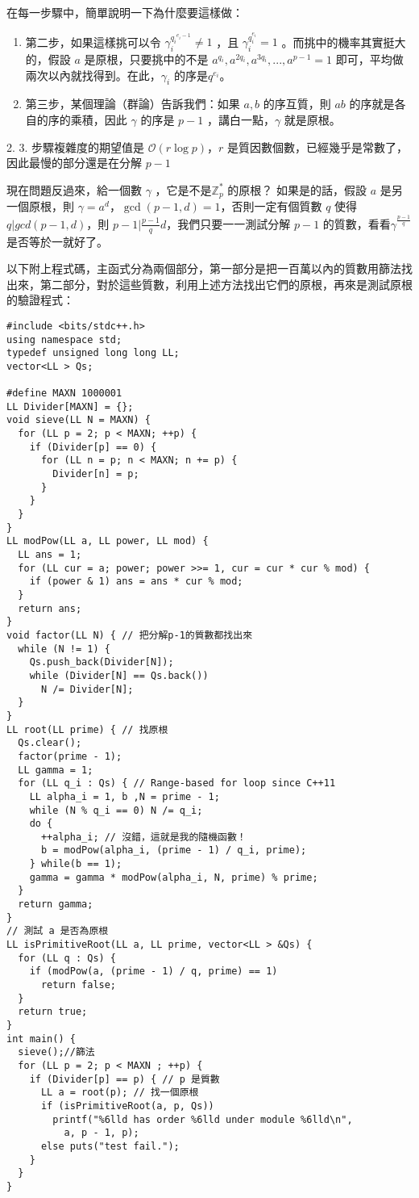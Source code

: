 在每一步驟中，簡單說明一下為什麼要這樣做：
\begin{enumerate}
\item 第二步，如果這樣挑可以令 $\gamma_i^{{q_i}^{e_i-1}}\neq 1$ ，且 $\gamma_i^{q_i^{e_i}}=1$ 。而挑中的機率其實挺大的，假設 $a$ 是原根，只要挑中的不是 $a^{q_i},a^{2q_i},a^{3q_i},...,a^{p-1}=1$ 即可，平均做兩次以內就找得到。在此，$\gamma_i$ 的序是$q^{e_i}$。
\item 第三步，某個理論（群論）告訴我們：如果 $a,b$ 的序互質，則 $ab$ 的序就是各自的序的乘積，因此 $\gamma$ 的序是 $p-1$ ，講白一點，$\gamma$ 就是原根。
\end{enumerate}

2. 3. 步驟複雜度的期望值是 $\mathcal{O}(r\log p)$，$r$ 是質因數個數，已經幾乎是常數了，因此最慢的部分還是在分解 $p-1$ 

現在問題反過來，給一個數 $\gamma$ ，它是不是$\mathbb Z_p^*$ 的原根？
如果是的話，假設 $a$ 是另一個原根，則 $\gamma=a^d$，$\gcd(p-1,d)=1$，否則一定有個質數 $q$ 使得 $q|gcd(p-1,d)$，則 $p-1|\frac {p-1} q d$，我們只要一一測試分解 $p-1$ 的質數，看看$\gamma^{\frac{p-1}{q}}$ 是否等於一就好了。

以下附上程式碼，主函式分為兩個部分，第一部分是把一百萬以內的質數用篩法找出來，第二部分，對於這些質數，利用上述方法找出它們的原根，再來是測試原根的驗證程式：
\begin{lstlisting}[caption=尋找與測試原根]
#include <bits/stdc++.h>
using namespace std;
typedef unsigned long long LL;
vector<LL > Qs;

#define MAXN 1000001
LL Divider[MAXN] = {};
void sieve(LL N = MAXN) {
  for (LL p = 2; p < MAXN; ++p) {
    if (Divider[p] == 0) {
      for (LL n = p; n < MAXN; n += p) {
        Divider[n] = p;
      }
    }
  }
}
LL modPow(LL a, LL power, LL mod) {
  LL ans = 1;
  for (LL cur = a; power; power >>= 1, cur = cur * cur % mod) {
    if (power & 1) ans = ans * cur % mod;
  }
  return ans;
}
void factor(LL N) { // 把分解p-1的質數都找出來
  while (N != 1) {
    Qs.push_back(Divider[N]);
    while (Divider[N] == Qs.back())
      N /= Divider[N];
  }
}
LL root(LL prime) { // 找原根
  Qs.clear();
  factor(prime - 1);
  LL gamma = 1;
  for (LL q_i : Qs) { // Range-based for loop since C++11
    LL alpha_i = 1, b ,N = prime - 1;
    while (N % q_i == 0) N /= q_i;
    do {
      ++alpha_i; // 沒錯，這就是我的隨機函數！
      b = modPow(alpha_i, (prime - 1) / q_i, prime);
    } while(b == 1);
    gamma = gamma * modPow(alpha_i, N, prime) % prime;
  }
  return gamma;
}
// 測試 a 是否為原根
LL isPrimitiveRoot(LL a, LL prime, vector<LL > &Qs) {
  for (LL q : Qs) {
    if (modPow(a, (prime - 1) / q, prime) == 1)
      return false;
  }
  return true;
}
int main() {
  sieve();//篩法
  for (LL p = 2; p < MAXN ; ++p) {
    if (Divider[p] == p) { // p 是質數
      LL a = root(p); // 找一個原根
      if (isPrimitiveRoot(a, p, Qs))
        printf("%6lld has order %6lld under module %6lld\n",
          a, p - 1, p);
      else puts("test fail.");
    }
  }
}
\end{lstlisting}


